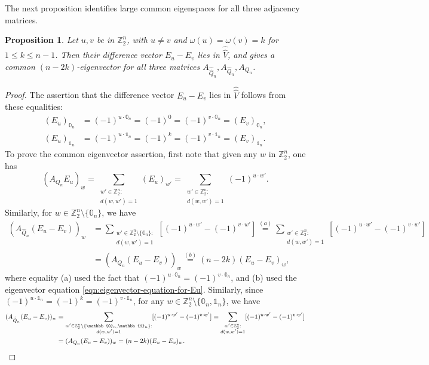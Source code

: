 \documentclass[10pt]{amsart}
\theoremstyle{plain}
\newtheorem{proposition}[conjecture]{Proposition}
\newcommand{\zero}{\mathbb{0}}
\newcommand{\one}{\mathbb{1}}
\newcommand{\ZZ}{\mathbb{Z}}
\begin{document}
The next proposition
identifies large common eigenspaces for 
all three adjacency matrices.

\begin{proposition}
\label{prop:difference-eigenvectors}
Let $u,v$ be in $\ZZ_2^n$, 
with $u \neq v$ and $\omega(u)=\omega(v)=k$ for $1 \leq k \leq n-1$.
Then their difference vector $E_u-E_v$
lies in $\hat{\hat{V}}$,
and gives a common $(n-2k)$-eigenvector
for all three matrices $A_{\hat{\hat{Q}}_n}, A_{\hat{Q}_n}, A_{Q_n}$.

\end{proposition}
\begin{proof}
The assertion that the difference vector $E_u-E_v$
lies in $\hat{\hat{V}}$
follows from these equalities:
\begin{align*}
(E_u)_{\zero_n}&=(-1)^{u \cdot \zero_n}=(-1)^0=(-1)^{v \cdot \zero_n}=(E_v)_{\zero_n},\\
(E_u)_{\one_n}&=(-1)^{u \cdot \one_n}=(-1)^k=(-1)^{v \cdot \one_n} =(E_v)_{\one_n}.
\end{align*}
To prove the common eigenvector assertion, first note that given 
any $w$ in
$\ZZ_2^n$, one has
$$
(A_{Q_n} E_u)_w
=\sum_{\substack{w' \in \ZZ_2^n:\\
d(w,w')=1}} (E_u)_{w'}
=\sum_{\substack{w' \in \ZZ_2^n:\\
d(w,w')=1}} (-1)^{u \cdot w'}.
$$
Similarly, for \( w\in \ZZ_2^n \setminus \{\zero_n\} \), we have
\begin{align*}
(A_{\hat{Q}_n} (E_u-E_v))_w
&=\sum_{\substack{w' \in \ZZ_2^n \setminus \{\zero_n\}:\\
d(w,w')=1}}
[(-1)^{u \cdot w'}
- (-1)^{v \cdot w'}]
\overset{(a)}{=}\sum_{\substack{w' \in \ZZ_2^n:\\
d(w,w')=1}} 
[(-1)^{u \cdot w'}
- (-1)^{v \cdot w'}]\\
&=(A_{Q_n} (E_u-E_v))_w
\overset{(b)}{=}(n-2k) (E_u-E_v)_w,
\end{align*}
where equality (a) used the fact that $(-1)^{u \cdot \zero_n}=(-1)^{v \cdot \zero_n}$, and (b) used the eigenvector equation \eqref{eqn:eigenvector-equation-for-Eu}.  
Similarly, since $(-1)^{u \cdot \one_n}=(-1)^k=(-1)^{v \cdot \one_n}$, 
for any $w\in \ZZ_2^n \setminus \{\zero_n,\one_n\}$, we have
\begin{align*}
(A_{\hat{\hat{Q}}_n} (E_u-E_v))_w
&=\sum_{\substack{w' \in \ZZ_2^n \setminus \{\zero_n,\one_n\}:\\
d(w,w')=1}} 
[(-1)^{u \cdot w'}
- (-1)^{v \cdot w'}]
=\sum_{\substack{w' \in \ZZ_2^n:\\
d(w,w')=1}} 
[(-1)^{u \cdot w'}
- (-1)^{v \cdot w'}]\\
&=(A_{Q_n} (E_u-E_v))_w
=(n-2k) (E_u-E_v)_w. \qedhere
\end{align*}
\end{proof}
\end{document}
